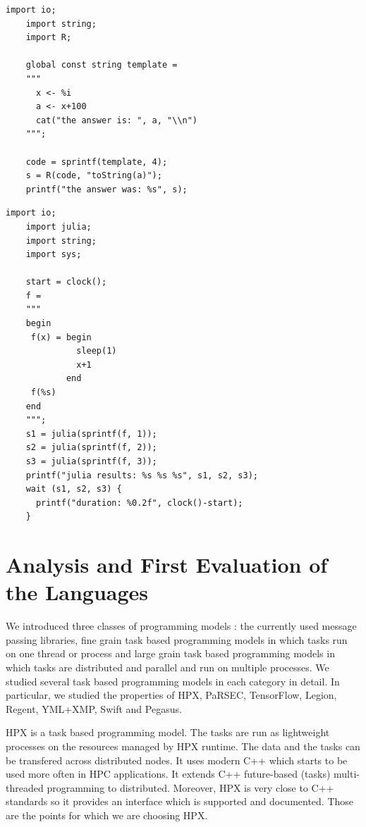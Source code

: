 \begin{enumerate}
	\begin{lstlisting}[basicstyle=\ttfamily, tabsize=3, frame=single, caption=Call of R code by a Swift application\label{lst:swift_Rswift}]
	import io;
	import string;
	import R;

	global const string template =
	"""
	  x <- %i
	  a <- x+100
	  cat("the answer is: ", a, "\\n")
	""";

	code = sprintf(template, 4);
	s = R(code, "toString(a)");
	printf("the answer was: %s", s);
	\end{lstlisting}


	\begin{lstlisting}[basicstyle=\ttfamily, tabsize=3, frame=single, caption=Call of  Julia code by a Swift application\label{lst:swift_juliaswift}]
	import io;
	import julia;
	import string;
	import sys;

	start = clock();
	f =
	"""
	begin
	 f(x) = begin
	          sleep(1)
	          x+1
	        end
	 f(%s)
	end
	""";
	s1 = julia(sprintf(f, 1));
	s2 = julia(sprintf(f, 2));
	s3 = julia(sprintf(f, 3));
	printf("julia results: %s %s %s", s1, s2, s3);
	wait (s1, s2, s3) {
	  printf("duration: %0.2f", clock()-start);
	}
	\end{lstlisting}
\end{enumerate}

\section{Analysis and First Evaluation of the Languages}

We introduced three classes of programming models : the currently used message passing libraries, fine grain task based programming models in which tasks run on one thread or process and large grain task based programming models in which tasks are distributed and parallel and run on multiple processes.
We studied several task based programming models in each category in detail.
In particular, we studied the properties of HPX, PaRSEC, TensorFlow, Legion, Regent, YML+XMP, Swift and Pegasus.

HPX is a task based programming model.
The tasks are run as lightweight processes on the resources managed by HPX runtime.
The data and the tasks can be transfered across distributed nodes.
It uses modern C++ which starts to be used more often in HPC applications.
It extends C++ future-based (tasks) multi-threaded programming to distributed.
Moreover, HPX is very close to C++ standards so it provides an interface which is supported and documented.
Those are the points for which we are choosing HPX.

